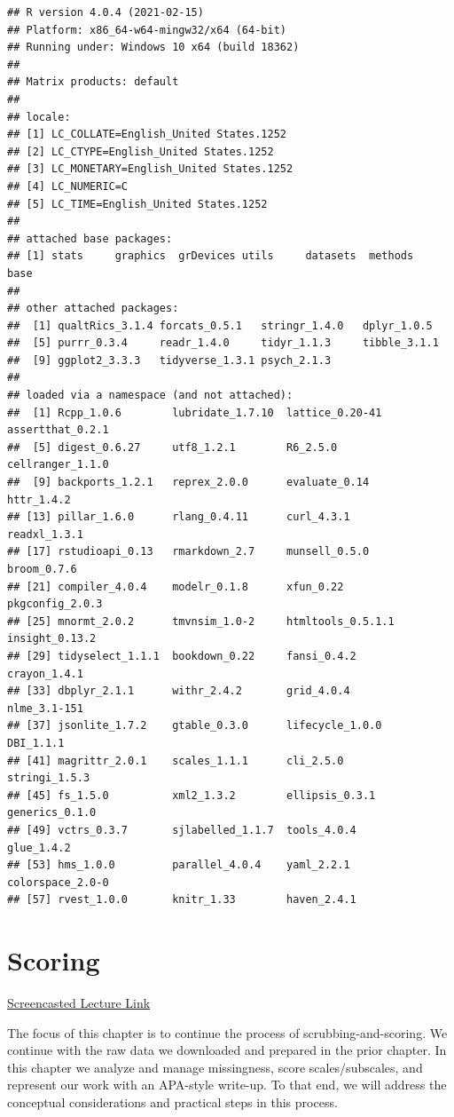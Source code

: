 \documentclass[
  english,
]{book}
\begin{document}
\begin{verbatim}
## R version 4.0.4 (2021-02-15)
## Platform: x86_64-w64-mingw32/x64 (64-bit)
## Running under: Windows 10 x64 (build 18362)
## 
## Matrix products: default
## 
## locale:
## [1] LC_COLLATE=English_United States.1252 
## [2] LC_CTYPE=English_United States.1252   
## [3] LC_MONETARY=English_United States.1252
## [4] LC_NUMERIC=C                          
## [5] LC_TIME=English_United States.1252    
## 
## attached base packages:
## [1] stats     graphics  grDevices utils     datasets  methods   base     
## 
## other attached packages:
##  [1] qualtRics_3.1.4 forcats_0.5.1   stringr_1.4.0   dplyr_1.0.5    
##  [5] purrr_0.3.4     readr_1.4.0     tidyr_1.1.3     tibble_3.1.1   
##  [9] ggplot2_3.3.3   tidyverse_1.3.1 psych_2.1.3    
## 
## loaded via a namespace (and not attached):
##  [1] Rcpp_1.0.6        lubridate_1.7.10  lattice_0.20-41   assertthat_0.2.1 
##  [5] digest_0.6.27     utf8_1.2.1        R6_2.5.0          cellranger_1.1.0 
##  [9] backports_1.2.1   reprex_2.0.0      evaluate_0.14     httr_1.4.2       
## [13] pillar_1.6.0      rlang_0.4.11      curl_4.3.1        readxl_1.3.1     
## [17] rstudioapi_0.13   rmarkdown_2.7     munsell_0.5.0     broom_0.7.6      
## [21] compiler_4.0.4    modelr_0.1.8      xfun_0.22         pkgconfig_2.0.3  
## [25] mnormt_2.0.2      tmvnsim_1.0-2     htmltools_0.5.1.1 insight_0.13.2   
## [29] tidyselect_1.1.1  bookdown_0.22     fansi_0.4.2       crayon_1.4.1     
## [33] dbplyr_2.1.1      withr_2.4.2       grid_4.0.4        nlme_3.1-151     
## [37] jsonlite_1.7.2    gtable_0.3.0      lifecycle_1.0.0   DBI_1.1.1        
## [41] magrittr_2.0.1    scales_1.1.1      cli_2.5.0         stringi_1.5.3    
## [45] fs_1.5.0          xml2_1.3.2        ellipsis_0.3.1    generics_0.1.0   
## [49] vctrs_0.3.7       sjlabelled_1.1.7  tools_4.0.4       glue_1.4.2       
## [53] hms_1.0.0         parallel_4.0.4    yaml_2.2.1        colorspace_2.0-0 
## [57] rvest_1.0.0       knitr_1.33        haven_2.4.1
\end{verbatim}

\hypertarget{score}{%
\chapter{Scoring}\label{score}}

\href{https://spu.hosted.panopto.com/Panopto/Pages/Viewer.aspx?pid=18a6be07-5bdc-404d-bc95-acf601830887}{Screencasted Lecture Link}

The focus of this chapter is to continue the process of scrubbing-and-scoring. We continue with the raw data we downloaded and prepared in the prior chapter. In this chapter we analyze and manage missingness, score scales/subscales, and represent our work with an APA-style write-up. To that end, we will address the conceptual considerations and practical steps in this process.
\end{document}
